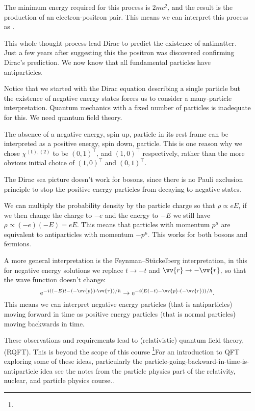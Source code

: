 \documentclass[fleqn]{NotesClass}
\newcommand*{\e}{\mathrm{e}}
\newcommand*{\trans}{\top}
\begin{document}
    The minimum energy required for this process is \(2mc^2\), and the result is the production of an electron-positron pair.
    This means we can interpret this process as .
    
    This whole thought process lead Dirac to predict the existence of antimatter.
    Just a few years after suggesting this the positron was discovered confirming Dirac's prediction.
    We now know that all fundamental particles have antiparticles.
    
    Notice that we started with the Dirac equation describing a single particle but the existence of negative energy states forces us to consider a many-particle interpretation.
    Quantum mechanics with a fixed number of particles is inadequate for this.
    We need quantum field theory.
    
    The absence of a negative energy, spin up, particle in its rest frame can be interpreted as a positive energy, spin down, particle.
    This is one reason why we chose \(\chi^{(1),(2)}\) to be \((0, 1)^\trans\), and \((1, 0)^\trans\) respectively, rather than the more obvious initial choice of \((1, 0)^\trans\) and \((0, 1)^\trans\).
    
    The Dirac sea picture doesn't work for bosons, since there is no Pauli exclusion principle to stop the positive energy particles from decaying to negative states.
    
    We can multiply the probability density by the particle charge so that \(\rho \propto eE\), if we then change the charge to \(-e\) and the energy to \(-E\) we still have \(\rho \propto (-e)(-E) = eE\).
    This means that particles with momentum \(p^\mu\) are equivalent to antiparticles with momentum \(-p^\mu\).
    This works for both bosons and fermions.
    
    A more general interpretation is the Feynman--St\"uckelberg interpretation, in this for negative energy solutions we replace \(t \to -t\) and \(\vv{r} \to -\vv{r}\), so that the wave function doesn't change:
    \begin{equation}
        \e^{-i((-E)t - (-\vv{p})\cdot\vv{r})/\hbar} \to \e^{-i(E(-t) - \vv{p}\cdot(-\vv{r}))/\hbar}.
    \end{equation}
    This means we can interpret negative energy particles (that is antiparticles) moving forward in time as positive energy particles (that is normal particles) moving backwards in time.
    
    These observations and requirements lead to (relativistic) quantum field theory, (RQFT).
    This is beyond the scope of this course
    \footnote{}{For an introduction to QFT exploring some of these ideas, particularly the particle-going-backward-in-time-is-antiparticle idea see the notes from the particle physics part of the relativity, nuclear, and particle physics course.}.
    
\end{document}
